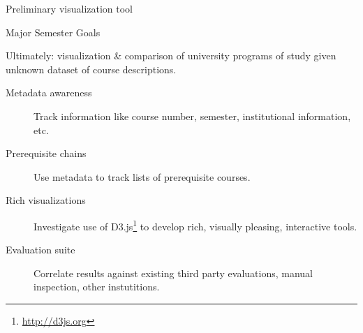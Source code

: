 \documentclass{beamer}
\begin{document}
  \begin{frame}{Preliminary visualization tool}





  \end{frame}

  \begin{frame}{Major Semester Goals}

    Ultimately: visualization \& comparison of university programs of study
    given unknown dataset of course descriptions.

    \begin{description}
      \item[Metadata awareness] Track information like course number,
      semester, institutional information, etc.
      \item[Prerequisite chains] Use metadata to track lists of
      prerequisite courses.
      \item[Rich visualizations] Investigate use of
      D3.js\footnote{\url{http://d3js.org}} to develop rich, visually
      pleasing, interactive tools.
      \item[Evaluation suite] Correlate results against existing third
      party evaluations, manual inspection, other instutitions.
    \end{description}

  \end{frame}
\end{document}
